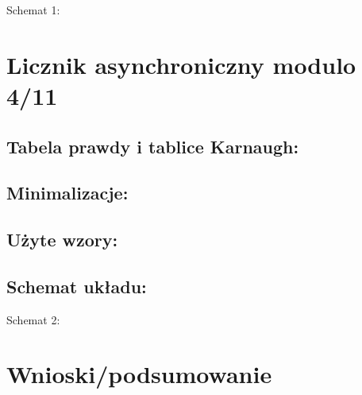 \documentclass[12pt,a4paper]{article}
\begin{document}
			\vspace{1.5cm}
			\begin{center}
				Schemat 1: 
			\end{center}
	
	\section{Licznik asynchroniczny modulo 4/11}
		
		\subsection{Tabela prawdy i tablice Karnaugh:}
			
			
	
		\subsection{Minimalizacje:}
			
		
			
		\subsection{Użyte wzory:}
		
			
			
		\subsection{Schemat układu:}
		
			\vspace{0.5cm}
			\begin{center}
				Schemat 2: 
			\end{center}

	\section{Wnioski/podsumowanie}
	
	
\end{document}

